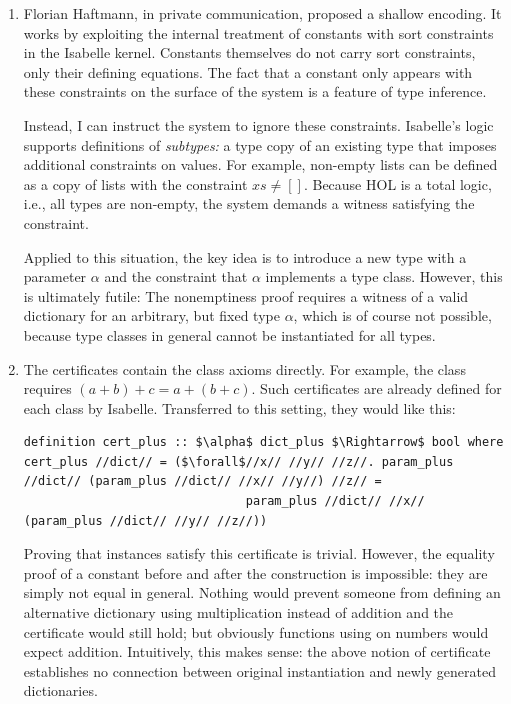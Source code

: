 \begin{enumerate}
  \item
    Florian Haftmann, in private communication, proposed a shallow encoding.
    It works by exploiting the internal treatment of constants with sort constraints in the Isabelle kernel.
    Constants themselves do not carry sort constraints, only their defining equations.
    The fact that a constant only appears with these constraints on the surface of the system is a feature of type inference.

    Instead, I can instruct the system to ignore these constraints.
    Isabelle's logic supports definitions of \emph{subtypes:}
    a type copy of an existing type that imposes additional constraints on values.
    For example, non-empty lists can be defined as a copy of lists with the constraint $\mathit{xs} \neq []$.
    Because HOL is a total logic, i.e., all types are non-empty, the system demands a witness satisfying the constraint.

    Applied to this situation, the key idea is to introduce a new type with a parameter $\alpha$ and the constraint that $\alpha$ implements a type class.
    However, this is ultimately futile:
    The nonemptiness proof requires a witness of a valid dictionary for an arbitrary, but fixed type $\alpha$, which is of course not possible, because type classes in general cannot be instantiated for all types.%
  \item
    The certificates contain the class axioms directly.
    For example, the  class requires $(a + b) + c = a + (b + c)$.
    Such certificates are already defined for each class by Isabelle.
    Transferred to this setting, they would like this:
    \begin{lstlisting}[language=Isabelle]
definition cert_plus :: $\alpha$ dict_plus $\Rightarrow$ bool where
cert_plus //dict// = ($\forall$//x// //y// //z//. param_plus //dict// (param_plus //dict// //x// //y//) //z// =
                               param_plus //dict// //x// (param_plus //dict// //y// //z//))\end{lstlisting}
    Proving that instances satisfy this certificate is trivial.
    However, the equality proof of a constant before and after the construction is impossible: they are simply not equal in general.
    Nothing would prevent someone from defining an alternative dictionary using multiplication instead of addition and the certificate would still hold; but obviously functions using  on numbers would expect addition.
    Intuitively, this makes sense: the above notion of certificate establishes no connection between original instantiation and newly generated dictionaries.


\end{enumerate}

